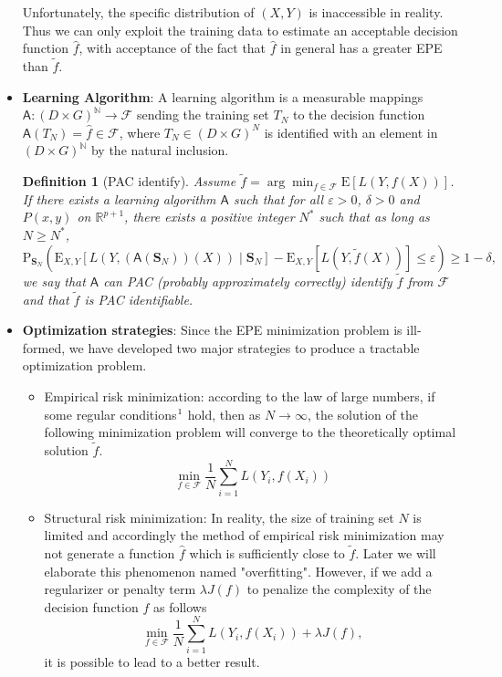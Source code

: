 \documentclass{report}
\newtheorem{definition}{Definition}[chapter]
\theoremstyle{nonumberplain}
\newcommand{\0}{\mathbf{0}}
\begin{document}
\begin{itemize}
	Unfortunately, the specific distribution of $(X,Y)$ is inaccessible in reality. Thus we can only exploit the training data to estimate an acceptable decision function $\hat{f}$, with acceptance of the fact that $\hat{f}$ in general has a greater EPE than $\tilde{f}$. 
	
	\item \textbf{Learning Algorithm}: 
	A learning algorithm is a measurable mappings $\mathsf{A}:(D\times G)^\mathbb{N}\to \mathcal{F}$ sending the training set $T_N$ to the decision function $\mathsf{A}(T_N)=\hat{f}\in \mathcal{F}$, where $T_N\in(D\times G)^N$ is identified with an element in $(D\times G)^\mathbb{N}$ by the natural inclusion.
	\begin{definition}[PAC identify]
		Assume $\tilde{f}=\arg\min_{f\in\mathcal{F}}\mathrm{E}[L(Y,f(X))]
		$. If there exists a learning algorithm $\mathsf{A}$ such that for all $\varepsilon>0$, $\delta>0$ and $P(x,y)$ on $\mathbb{R}^{p+1}$, there exists a positive integer $N^*$ such that as long as $N\ge N^*$,
		\[
		\mathrm{P}_{\mathbf{S}_N}\left(\mathrm{E}_{X,Y}[L(Y,(\mathsf{A}(\mathbf{S}_N))(X))\mid \mathbf{S}_N]-\mathrm{E}_{X,Y}[L(Y,\tilde{f}(X))] \le \varepsilon\right) \ge 1-\delta,
		\]
		we say that $\mathsf{A}$ can PAC (probably approximately correctly) identify $\tilde{f}$ from $\mathcal{F}$ and that $\tilde{f}$ is PAC identifiable.
	\end{definition}
	
	\item \textbf{Optimization strategies}: Since the EPE minimization problem is ill-formed, we have developed two major strategies to produce a tractable optimization problem. 
	\begin{itemize}
		\item Empirical risk minimization: according to the law of large numbers, if some regular conditions$\footnote{For example, the uniform law of large numbers can be applied here. The details are consigned to the appendix.}$ hold, then as $N\to\infty$, the solution of the following minimization problem will converge to the theoretically optimal solution $\tilde{f}$.
		\[
		\min_{f\in\mathcal{F}}\frac{1}{N}\sum_{i=1}^{N}L(Y_i,f(X_i))
		\]
		
		\item Structural risk minimization: In reality, the size of training set $N$ is limited and accordingly the method of empirical risk minimization may not generate a function $\hat{f}$ which is sufficiently close to $\tilde{f}$. Later we will elaborate this phenomenon named "overfitting". However, if we add a regularizer or penalty term $\lambda J(f)$ to penalize the complexity of the decision function $f$ as follows
		\[
		\min_{f\in\mathcal{F}}\frac{1}{N}\sum_{i=1}^{N}L(Y_i,f(X_i))+\lambda J(f),
		\]
		it is possible to lead to a better result.
	\end{itemize} 
	
\end{itemize} 
\end{document}
